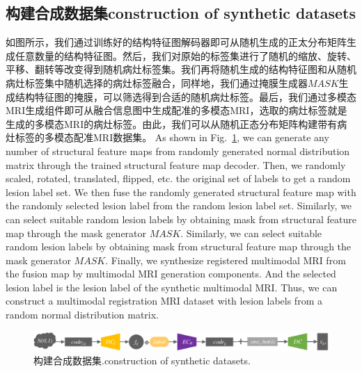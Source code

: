 \documentclass[letterpaper]{article} %
\begin{document}
\subsection{构建合成数据集construction of synthetic datasets}
\label{make dataset}
如图所示，我们通过训练好的结构特征图解码器即可从随机生成的正太分布矩阵生成任意数量的结构特征图。然后，我们对原始的标签集进行了随机的缩放、旋转、平移、翻转等改变得到随机病灶标签集。我们再将随机生成的结构特征图和从随机病灶标签集中随机选择的病灶标签融合，同样地，我们通过掩膜生成器$MASK$生成结构特征图的掩膜，可以筛选得到合适的随机病灶标签。最后，我们通过多模态MRI生成组件即可从融合信息图中生成配准的多模态MRI，选取的病灶标签就是生成的多模态MRI的病灶标签。由此，我们可以从随机正态分布矩阵构建带有病灶标签的多模态配准MRI数据集。
As shown in Fig.~\ref{make_data}, we can generate any number of structural feature maps from randomly generated normal distribution matrix through the trained structural feature map decoder. Then, we randomly scaled, rotated, translated, flipped, etc. the original set of labels to get a random lesion label set. We then fuse the randomly generated structural feature map with the randomly selected lesion label from the random lesion label set. Similarly, we can select suitable random lesion labels by obtaining mask from structural feature map through the mask generator $MASK$. Similarly, we can select suitable random lesion labels by obtaining mask from structural feature map through the mask generator $MASK$. Finally, we synthesize registered multimodal MRI from the fusion map by multimodal MRI generation components. And the selected lesion label is the lesion label of the synthetic multimodal MRI. Thus, we can construct a multimodal registration MRI dataset with lesion labels from a random normal distribution matrix.
\begin{figure}
	\centering
	\includegraphics[width=0.98\columnwidth]{figures/make_data}
	\caption{构建合成数据集.construction of synthetic datasets.}
	\label{make_data}
\end{figure}
\end{document}
